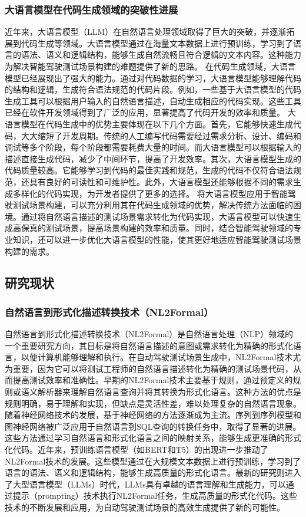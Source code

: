 \documentclass{article}
\begin{document}
\subsubsection{大语言模型在代码生成领域的突破性进展}
近年来，大语言模型（LLM）在自然语言处理领域取得了巨大的突破，并逐渐拓展到代码生成等领域。大语言模型通过在海量文本数据上进行预训练，学习到了语言的语法、语义和逻辑结构，能够生成自然流畅且符合逻辑的文本内容。这种能力为解决智能驾驶测试场景构建的难题提供了新的思路。
在代码生成领域，大语言模型已经展现出了强大的能力。通过对代码数据的学习，大语言模型能够理解代码的结构和逻辑，生成符合语法规范的代码片段。例如，一些基于大语言模型的代码生成工具可以根据用户输入的自然语言描述，自动生成相应的代码实现。这些工具已经在软件开发领域得到了广泛的应用，显著提高了代码开发的效率和质量。
大语言模型在代码生成中的优势主要体现在以下几个方面。首先，它能够快速生成代码，大大缩短了开发周期。传统的人工编写代码需要经过需求分析、设计、编码和调试等多个阶段，每个阶段都需要耗费大量的时间。而大语言模型可以根据输入的描述直接生成代码，减少了中间环节，提高了开发效率。其次，大语言模型生成的代码质量较高。它能够学习到代码的最佳实践和规范，生成的代码不仅符合语法规范，还具有良好的可读性和可维护性。此外，大语言模型还能够根据不同的需求生成多样化的代码实现，为开发者提供了更多的选择。
将大语言模型应用于智能驾驶测试场景构建，可以充分利用其在代码生成领域的优势，解决传统方法面临的困境。通过将自然语言描述的测试场景需求转化为代码实现，大语言模型可以快速生成高保真的测试场景，提高场景构建的效率和质量。同时，结合智能驾驶领域的专业知识，还可以进一步优化大语言模型的性能，使其更好地适应智能驾驶测试场景构建的需求。


\subsection{研究现状}
\subsubsection{自然语言到形式化描述转换技术（NL2Formal）}
自然语言到形式化描述转换技术（NL2Formal）是自然语言处理（NLP）领域的一个重要研究方向，其目标是将自然语言描述的意图或需求转化为精确的形式化语言，以便计算机能够理解和执行。在自动驾驶测试场景生成中，NL2Formal技术尤为重要，因为它可以将测试工程师的自然语言描述转化为精确的测试场景代码，从而提高测试效率和准确性。早期的NL2Formal技术主要基于规则，通过预定义的规则或语义解析器来理解自然语言查询并将其转换为形式化语言。这种方法的优点是规则明确，易于理解和实现，但缺点是灵活性差，难以处理复杂的自然语言现象。随着神经网络技术的发展，基于神经网络的方法逐渐成为主流。序列到序列模型和图神经网络被广泛应用于自然语言到SQL查询的转换任务中，取得了显著的进展。这些方法通过学习自然语言和形式化语言之间的映射关系，能够生成更准确的形式化代码。近年来，预训练语言模型（如BERT和T5）的出现进一步推动了NL2Formal技术的发展。这些模型通过在大规模文本数据上进行预训练，学习到了语言的语法、语义和逻辑结构，能够生成高质量的形式化语言。最新的研究则进入了大型语言模型（LLMs）时代，LLMs具有卓越的语言理解和生成能力，可以通过提示（prompting）技术执行NL2Formal任务，生成高质量的形式化代码。这些技术的不断发展和应用，为自动驾驶测试场景的高效生成提供了新的可能性。
\end{document}
